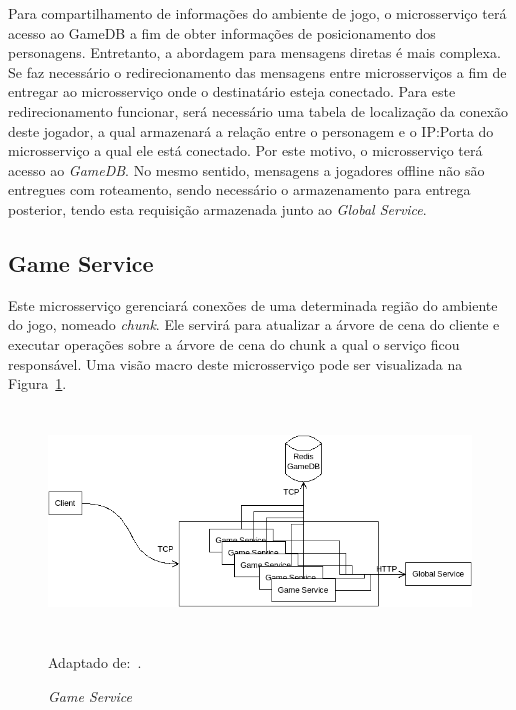 Para compartilhamento de informações do ambiente de jogo, o microsserviço terá acesso ao GameDB a fim de obter informações de posicionamento dos personagens.
%
Entretanto, a abordagem para mensagens diretas é mais complexa.
%
Se faz necessário o redirecionamento das mensagens entre microsserviços a fim de entregar ao microsserviço onde o destinatário esteja conectado.
%
Para este redirecionamento funcionar, será necessário uma tabela de localização da conexão deste jogador, a qual armazenará a relação entre o personagem e o IP:Porta do microsserviço a qual ele está conectado.
%
Por este motivo, o microsserviço terá acesso ao \textit{GameDB}.
%
No mesmo sentido, mensagens a jogadores offline não são entregues com roteamento, sendo necessário o armazenamento para entrega posterior, tendo esta requisição armazenada junto ao \textit{Global Service}.



\subsection{Game Service}



Este microsserviço gerenciará conexões de uma determinada região do ambiente do jogo, nomeado \textit{chunk}.
%
Ele servirá para atualizar a árvore de cena do cliente e executar operações sobre a árvore de cena do chunk a qual o serviço ficou responsável.
%
Uma visão macro deste microsserviço pode ser visualizada na Figura~\ref{fig:game_service}.


\begin{figure}[htb!]
  \caption{\textit{Game Service}}
  \label{fig:game_service}
  \includegraphics[height=6cm]{img/cap3/game_service.png}
  \centering

  Adaptado de:~\cite{albion_online_unite}.
\end{figure}



